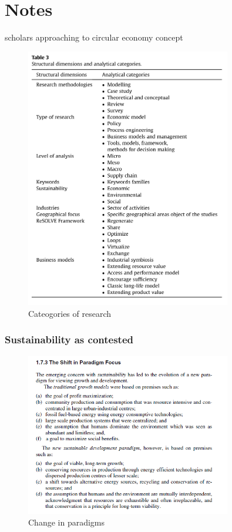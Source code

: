 \chapter{Notes}


\parencite{Merli2018} scholars approaching to circular economy concept


\begin{figure}[h!]
    \centering
    \includegraphics[width=0.8\textwidth]{sections/asset/cateogories of research.PNG}
    \caption{Cateogories of research}
    \label{fig:research cat}
\end{figure}


\subsection{Sustainability as contested}


\parencite{Stimson2006}


\begin{figure}[h!]
    \centering
    \includegraphics[width=0.8\textwidth]{sections/asset/shift.PNG}
    \caption{Change in paradigms}
    \label{fig:shift}
\end{figure}

